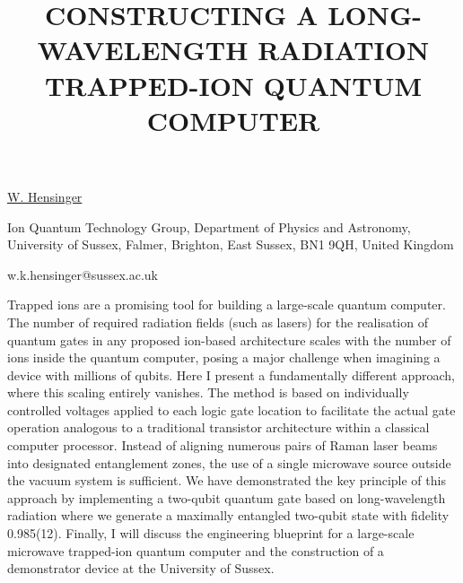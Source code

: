\title{CONSTRUCTING A LONG-WAVELENGTH RADIATION TRAPPED-ION QUANTUM COMPUTER}

\underline{W. Hensinger} 

{\normalsize{\vspace{-4mm}
Ion Quantum Technology Group,
Department of Physics and Astronomy,
University of Sussex,
Falmer, Brighton, East Sussex, BN1 9QH,
United Kingdom

\email w.k.hensinger@sussex.ac.uk}}

Trapped ions are a promising tool for building a large-scale quantum computer. The number of required radiation fields (such as lasers) for the realisation of quantum gates in any proposed ion-based architecture scales with the number of ions inside the quantum computer, posing a major challenge when imagining a device with millions of qubits. Here I present a fundamentally different approach, where this scaling entirely vanishes. The method is based on individually controlled voltages applied to each logic gate location to facilitate the actual gate operation analogous to a traditional transistor architecture within a classical computer processor. Instead of aligning numerous pairs of Raman laser beams into designated entanglement zones, the use of a single microwave source outside the vacuum system is sufficient. We have demonstrated the key principle of this approach by implementing a two-qubit quantum gate based on long-wavelength radiation where we generate a maximally entangled two-qubit state with fidelity 0.985(12). Finally, I will discuss the engineering blueprint for a large-scale microwave trapped-ion quantum computer and the construction of a demonstrator device at the University of Sussex.

%
%



\vspace{\baselineskip} 